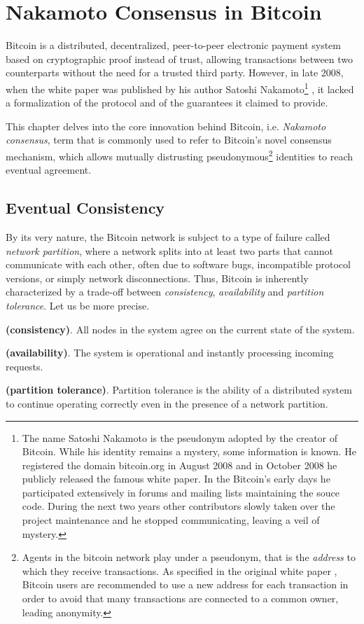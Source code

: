 \chapter{Nakamoto Consensus in Bitcoin}
\label{chpr:btc}
Bitcoin is a distributed, decentralized, peer-to-peer electronic payment system based on cryptographic proof instead of trust, allowing transactions between two counterparts without the need for a trusted third party. However, in late 2008, when the white paper was published by his author Satoshi Nakamoto\footnote{The name Satoshi Nakamoto is the pseudonym adopted by the creator of Bitcoin. While his identity remains a mystery, some information is known. He registered the domain bitcoin.org in August 2008 and in October 2008 he publicly released the famous white paper. In the Bitcoin's early days he participated extensively in forums and mailing lists maintaining the souce code. During the next two years other contributors slowly taken over the project maintenance and he stopped communicating, leaving a veil of mystery.} \cite{nakamoto2012bitcoin}, it lacked a formalization of the protocol and of the guarantees it claimed to provide.

\bigskip
\noindent
This chapter delves into the core innovation behind Bitcoin, i.e. \textit{Nakamoto consensus}, term that is commonly used to refer to Bitcoin's novel consensus mechanism, which allows mutually distrusting pseudonymous\footnote{Agents in the bitcoin network play under a pseudonym, that is the \textit{address} to which they receive transactions. As specified in the original white paper \cite{nakamoto2012bitcoin}, Bitcoin users are recommended to use a new address for each transaction in order to avoid that many transactions are connected to a common owner, leading anonymity.} identities to reach eventual agreement.

\bigskip
\section{Eventual Consistency}
\label{sec:eventual-consistency}
By its very nature, the Bitcoin network is subject to a type of failure called \textit{network partition}, where a network splits into at least two parts that cannot communicate with each other, often due to software bugs, incompatible protocol versions, or simply network disconnections.
Thus, Bitcoin is inherently characterized by a trade-off between \textit{consistency}, \textit{availability} and \textit{partition tolerance}. Let us be more precise.
\begin{mydef} {\bf (consistency)}.
    All nodes in the system agree on the current state of the system.
\end{mydef}
\begin{mydef} {\bf (availability)}.
    The system is operational and instantly processing incoming requests.
\end{mydef}
\begin{mydef} {\bf (partition tolerance)}.
    Partition tolerance is the ability of a distributed system to continue operating correctly even in the presence of a network partition.
\end{mydef}

